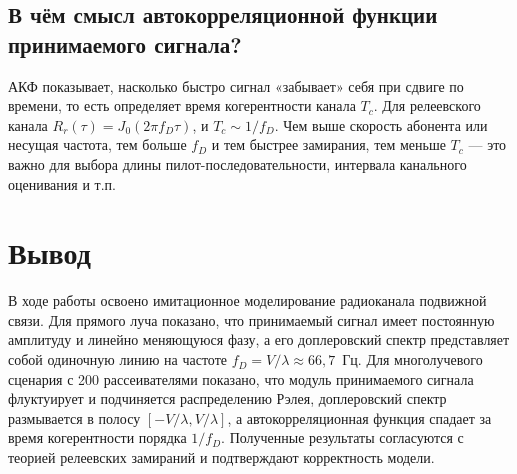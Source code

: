 \subsection{В чём смысл автокорреляционной функции принимаемого сигнала?}

АКФ показывает, насколько быстро сигнал «забывает» себя при сдвиге по
времени, то есть определяет время когерентности канала $T_c$. Для
релеевского канала $R_r(\tau) = J_0(2\pi f_D\tau)$, и $T_c \sim 1/f_D$.
Чем выше скорость абонента или несущая частота, тем больше $f_D$ и тем
быстрее замирания, тем меньше $T_c$ — это важно для выбора длины
пилот-последовательности, интервала канального оценивания и т.п.

\section*{Вывод}

В ходе работы освоено имитационное моделирование радиоканала подвижной
связи. Для прямого луча показано, что принимаемый сигнал имеет постоянную
амплитуду и линейно меняющуюся фазу, а его доплеровский спектр
представляет собой одиночную линию на частоте $f_D = V/\lambda \approx
66{,}7$~Гц. Для многолучевого сценария с 200 рассеивателями показано, что
модуль принимаемого сигнала флуктуирует и подчиняется распределению
Рэлея, доплеровский спектр размывается в полосу $[-V/\lambda, V/\lambda]$,
а автокорреляционная функция спадает за время когерентности порядка
$1/f_D$. Полученные результаты согласуются с теорией релеевских замираний
и подтверждают корректность модели.

\endinput
